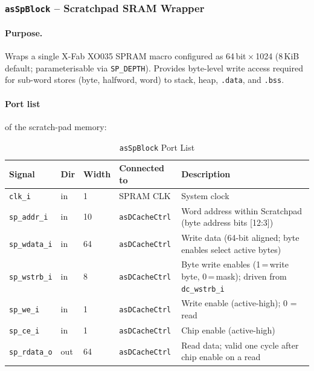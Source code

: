 \subsubsection{\texttt{asSpBlock} -- Scratchpad SRAM Wrapper}
\label{subsubsec:asSpBlock}

\paragraph{Purpose.}
Wraps a single X-Fab XO035 SPRAM macro configured as
64\,bit\,$\times$\,1024 (8\,KiB default; parameterisable via
\texttt{SP\_DEPTH}).
Provides byte-level write access required for sub-word stores (byte,
halfword, word) to stack, heap, \texttt{.data}, and \texttt{.bss}.

\paragraph{Port list} of the scratch-pad memory:

\begin{table}[H]
\caption{\texttt{asSpBlock} Port List}
\label{tab:asSpBlockPorts}
\centering
\begin{tabularx}{\textwidth}{|l |l |l |l |X|}
  \hline
  Signal & Dir & Width & Connected to & Description \\
  \hline
  \hline
  \texttt{clk\_i}        & in  & 1  & SPRAM CLK             & System clock \\
  \hline
  \texttt{sp\_addr\_i}   & in  & 10 & \texttt{asDCacheCtrl} & Word address within Scratchpad (byte address bits [12:3]) \\
  \hline
  \texttt{sp\_wdata\_i}  & in  & 64 & \texttt{asDCacheCtrl} & Write data (64-bit aligned; byte enables select active bytes) \\
  \hline
  \texttt{sp\_wstrb\_i}  & in  & 8  & \texttt{asDCacheCtrl} & Byte write enables (1\,=\,write byte, 0\,=\,mask); driven from \texttt{dc\_wstrb\_i} \\
  \hline
  \texttt{sp\_we\_i}     & in  & 1  & \texttt{asDCacheCtrl} & Write enable (active-high); 0 = read \\
  \hline
  \texttt{sp\_ce\_i}     & in  & 1  & \texttt{asDCacheCtrl} & Chip enable (active-high) \\
  \hline
  \texttt{sp\_rdata\_o}  & out & 64 & \texttt{asDCacheCtrl} & Read data; valid one cycle after chip enable on a read \\
  \hline
\end{tabularx}
\end{table}

